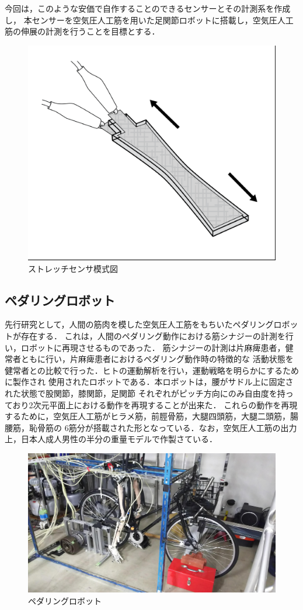 今回は，このような安価で自作することのできるセンサーとその計測系を作成し，
本センサーを空気圧人工筋を用いた足関節ロボットに搭載し，空気圧人工筋の伸展の計測を行うことを目標とする．
\begin{figure}[h]
    \begin{center}
        \includegraphics[width=0.5\columnwidth]{./1_prolusion/MITSoftRobotics.eps}
        \caption{ストレッチセンサ模式図\cite{MITSoftRobot}}
        \label{MITSoftRobot表紙}
    \end{center}
\end{figure}

\subsection{ペダリングロボット}
先行研究として，人間の筋肉を模した空気圧人工筋をもちいたペダリングロボットが存在する．
これは，人間のペダリング動作における筋シナジーの計測を行い，ロボットに再現させるものであった．
筋シナジーの計測は片麻痺患者，健常者ともに行い，片麻痺患者におけるペダリング動作時の特徴的な
活動状態を健常者との比較で行った．ヒトの運動解析を行い，運動戦略を明らかにするために製作され
使用されたロボットである．本ロボットは，腰がサドル上に固定された状態で股関節，膝関節，足関節
それぞれがピッチ方向にのみ自由度を持っており2次元平面上における動作を再現することが出来た．
これらの動作を再現するために，空気圧人工筋がヒラメ筋，前脛骨筋，大腿四頭筋，大腿二頭筋，腸腰筋，恥骨筋の
6筋分が搭載された形となっている．なお，空気圧人工筋の出力上，日本人成人男性の半分の重量モデルで作製さている．\cite{watanabe}
\begin{figure}[h]
 \begin{center}
  \includegraphics[width=0.75\columnwidth,clip]{./1_prolusion/1st.eps}
  \caption{ペダリングロボット}
  \label{初号機}
  \end{center}
\end{figure}

